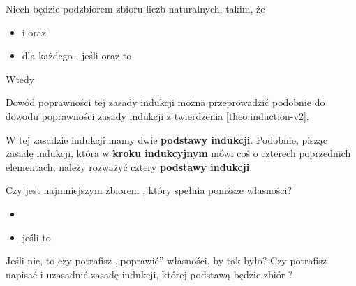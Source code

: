 \begin{theo}
Niech  będzie podzbiorem zbioru liczb naturalnych, takim, że 
\begin{itemize}
    \item {} i  oraz
    \item dla każdego , jeśli  oraz  to 
\end{itemize}
Wtedy 
\label{theo:induction-v4}
\end{theo}

Dowód poprawności tej zasady indukcji można przeprowadzić podobnie do dowodu poprawności zasady indukcji z twierdzenia \ref{theo:induction-v2}.

W tej zasadzie indukcji mamy dwie \textbf{podstawy indukcji}. Podobnie, pisząc zasadę indukcji, która w \textbf{kroku indukcyjnym} mówi coś o czterech poprzednich elementach, należy rozważyć cztery \textbf{podstawy indukcji}.

\begin{ex}
Czy  jest najmniejszym zbiorem , który spełnia poniższe własności? 

\begin{itemize}
    \item {}
    \item jeśli  to 
\end{itemize}

Jeśli nie, to czy potrafisz ,,poprawić'' własności, by tak było? Czy potrafisz napisać i uzasadnić zasadę indukcji, której podstawą będzie zbiór ?
\end{ex}

